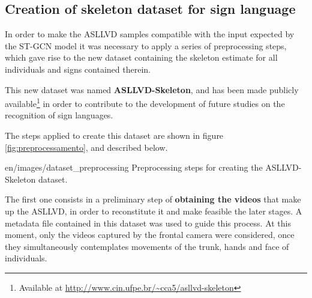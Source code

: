 

\subsection{Creation of skeleton dataset for sign language} %
\label{sec:criacao-dataset}

In order to make the ASLLVD samples compatible with the input expected by the ST-GCN model it was necessary to apply a series of preprocessing steps, which gave rise to the new dataset containing the skeleton estimate for all individuals and signs contained therein.


This new dataset was named \textbf{ASLLVD-Skeleton}, and has been made publicly available\footnote{
   Available at \url{http://www.cin.ufpe.br/~cca5/asllvd-skeleton}
} in order to contribute to the development of future studies on the recognition of sign languages.


The steps applied to create this dataset are shown in figure \ref{fig:preprocessamento}, and described below.


    {en/images/dataset_preprocessing}
    {Preprocessing steps for creating the ASLLVD-Skeleton dataset.}

The first one consists in a preliminary step of \textbf{obtaining the videos} that make up the ASLLVD, in order to reconstitute it and make feasible the later stages. A metadata file contained in this dataset was used to guide this process. At this moment, only the videos captured by the frontal camera were considered, once they simultaneously contemplates movements of the trunk, hands and face of individuals.

